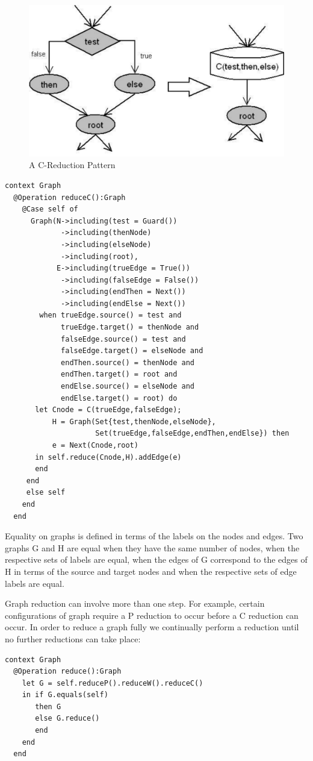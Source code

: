 %
\begin{figure}
\begin{center}

\includegraphics[width=12cm]{LanguageEngineering/Commands/Images/C}

\caption{A C-Reduction Pattern\label{fig:A-C-Reduction-Pattern}}

\end{center}
\end{figure}


\begin{lstlisting}
context Graph
  @Operation reduceC():Graph
    @Case self of
      Graph(N->including(test = Guard())
             ->including(thenNode)
             ->including(elseNode)
             ->including(root),
            E->including(trueEdge = True())
             ->including(falseEdge = False())
             ->including(endThen = Next())
             ->including(endElse = Next())
        when trueEdge.source() = test and
             trueEdge.target() = thenNode and
             falseEdge.source() = test and
             falseEdge.target() = elseNode and
             endThen.source() = thenNode and
             endThen.target() = root and
             endElse.source() = elseNode and
             endElse.target() = root) do
       let Cnode = C(trueEdge,falseEdge);
           H = Graph(Set{test,thenNode,elseNode},
                     Set(trueEdge,falseEdge,endThen,endElse}) then
           e = Next(Cnode,root)
       in self.reduce(Cnode,H).addEdge(e)
       end
     end
     else self
    end
  end
\end{lstlisting}Equality on graphs is defined in terms of the labels on the nodes
and edges. Two graphs G and H are equal when they have the same number
of nodes, when the respective sets of labels are equal, when the edges
of G correspond to the edges of 
H in terms of the source and target nodes and when the respective
sets of edge labels are equal. 

Graph reduction can involve more than one step. For example, certain
configurations of graph require a P reduction
to occur before a C reduction can occur. In
order to reduce a graph fully we continually perform a reduction until
no further reductions can take place:

\begin{lstlisting}
context Graph
  @Operation reduce():Graph
    let G = self.reduceP().reduceW().reduceC()
    in if G.equals(self)
       then G
       else G.reduce()
       end
    end
  end
\end{lstlisting}
